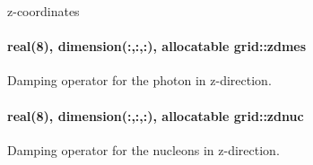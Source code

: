 z-\/coordinates 

\paragraph[{\texorpdfstring{zdmes}{zdmes}}]{\setlength{\rightskip}{0pt plus 5cm}real(8), dimension(\+:,\+:,\+:), allocatable grid\+::zdmes}\hypertarget{namespacegrid_af1ff89ca0b7f52aa01202240df562a10}{}\label{namespacegrid_af1ff89ca0b7f52aa01202240df562a10}


Damping operator for the photon in z-\/direction. 

\paragraph[{\texorpdfstring{zdnuc}{zdnuc}}]{\setlength{\rightskip}{0pt plus 5cm}real(8), dimension(\+:,\+:,\+:), allocatable grid\+::zdnuc}\hypertarget{namespacegrid_af4a35d1cb4ef0d6a9e9eac420a4e9638}{}\label{namespacegrid_af4a35d1cb4ef0d6a9e9eac420a4e9638}


Damping operator for the nucleons in z-\/direction. 

